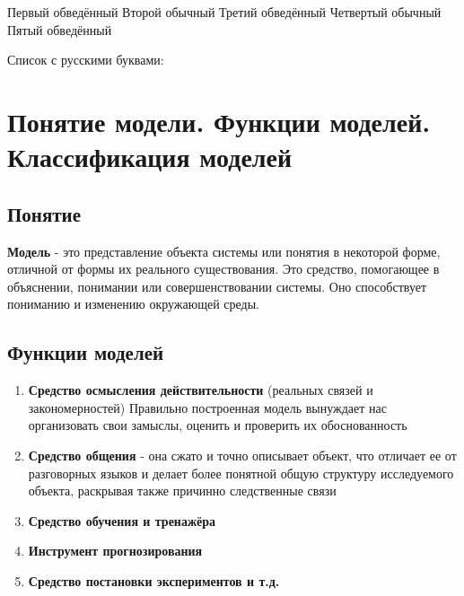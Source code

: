

	
	\tableofcontents
	\newpage
	
	\vspace{-2em}
	
	\noindent
	\begin{adjustbox}{valign=m}
		\begin{minipage}[t]{0.65\textwidth}
			\begin{flexlist}
				\circleditem Первый обведённый
				\plainitem Второй обычный
				\circleditem Третий обведённый
				\plainitem Четвертый обычный
				\circleditem Пятый обведённый
			\end{flexlist}
		\end{minipage}
	\end{adjustbox}
	\hspace{1em}
	\begin{adjustbox}{valign=m}
		\begin{pinkbox}
			\par
			Список с русскими буквами:
			{\setcounter{ruscount}{0} %
			}
		\end{pinkbox}
	\end{adjustbox}
	
	\section{Понятие модели. Функции моделей. Классификация моделей}

	\subsection{Понятие}
	\textbf{Модель} - это представление объекта системы или понятия в некоторой форме, отличной от формы их реального существования. Это средство, помогающее в объяснении, понимании или совершенствовании системы. Оно способствует пониманию и изменению окружающей среды.
	
	\subsection{Функции моделей}
	\begin{enumerate}
		\item \textbf{Средство осмысления действительности} (реальных связей и закономерностей) 
		\newline
		Правильно построенная модель вынуждает нас организовать свои замыслы, оценить и проверить их обоснованность
		\item \textbf{Средство общения} - она сжато и точно описывает объект, что отличает ее от разговорных языков и делает более понятной общую структуру исследуемого объекта, раскрывая также причинно следственные связи
		\item \textbf{Средство обучения и тренажёра}
		\item \textbf{Инструмент прогнозирования}
		\item \textbf{Средство постановки экспериментов и т.д.}
	\end{enumerate}
	
